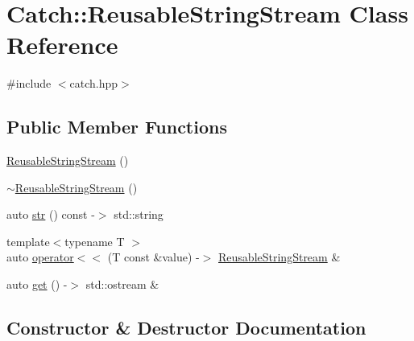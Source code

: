 \hypertarget{class_catch_1_1_reusable_string_stream}{}\section{Catch\+:\+:Reusable\+String\+Stream Class Reference}
\label{class_catch_1_1_reusable_string_stream}


{\ttfamily \#include $<$catch.\+hpp$>$}

\subsection*{Public Member Functions}
\begin{DoxyCompactItemize}
\item 
\mbox{\hyperlink{class_catch_1_1_reusable_string_stream_a9b3f8c52b0d2d63ffd825297a9c09781}{Reusable\+String\+Stream}} ()
\item 
\mbox{\hyperlink{class_catch_1_1_reusable_string_stream_aba9384e258a4db3178447b6a58414712}{$\sim$\+Reusable\+String\+Stream}} ()
\item 
auto \mbox{\hyperlink{class_catch_1_1_reusable_string_stream_a0e9ecf260b2a5d35f4886ef0d51f6270}{str}} () const -\/$>$ std\+::string
\item 
{\footnotesize template$<$typename T $>$ }\\auto \mbox{\hyperlink{class_catch_1_1_reusable_string_stream_af95f72024c082db70e5e50782e28e4f6}{operator$<$$<$}} (T const \&value) -\/$>$ \mbox{\hyperlink{class_catch_1_1_reusable_string_stream}{Reusable\+String\+Stream}} \&
\item 
auto \mbox{\hyperlink{class_catch_1_1_reusable_string_stream_a6881808c60a080d4e24a0b81c94cbf67}{get}} () -\/$>$ std\+::ostream \&
\end{DoxyCompactItemize}


\subsection{Constructor \& Destructor Documentation}
\mbox{\label{class_catch_1_1_reusable_string_stream_a9b3f8c52b0d2d63ffd825297a9c09781}} 
